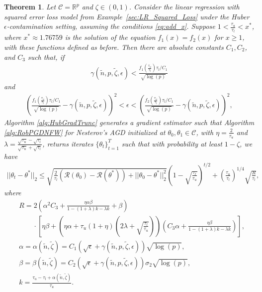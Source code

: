 \documentclass{article}
\newtheorem{theorem}{Theorem}
\begin{document}
\begin{theorem}
\label{theorem:Hu_eps_Nester}
Let $\mathcal{C} = \mathbb{R}^p$ and $\zeta \in (0, 1)$. Consider the linear regression with squared error loss model from Example~\ref{sec:LR_Squared_Loss} under the Huber $\epsilon$-contamination setting, assuming the conditions \eqref{eq:add_x}. Suppose $1 < \frac{\tau_u}{\tau_l} < x^*$, where $x^* \approx 1.76759$ is the solution of the equation $f_1(x) = f_2(x)$ for $x \geq 1$, with these functions defined as before. Then there are absolute constants $C_1, C_2$, and $C_3$ such that, if \begin{align*}
\gamma(\widetilde{n}, p, \widetilde{\zeta}, \epsilon) < \frac{f_1\left(\frac{\tau_u}{\tau_l}\right)\tau_l/C_1}{\sqrt{\log(p)}}
\end{align*}
and
\begin{align*}
\left(\frac{f_1\left(\frac{\tau_u}{\tau_l}\right)\tau_l/C_1}{\sqrt{\log(p)}} - \gamma(\widetilde{n}, p, \widetilde{\zeta}, \epsilon)\right)^2 < \epsilon < \left(\frac{f_2\left(\frac{\tau_u}{\tau_l}\right)\tau_l/C_1}{\sqrt{\log(p)}} - \gamma(\widetilde{n}, p, \widetilde{\zeta}, \epsilon)\right)^2,
\end{align*}  
Algorithm \ref{alg:HubGradTrunc} generates a gradient estimator such that Algorithm \ref{alg:RobPGDNFW} for Nesterov's AGD initialized at $\theta_0, \theta_1 \in \mathcal{C}$, with $\eta = \frac{2}{\tau_u}$ and $\lambda = \frac{\sqrt{\tau_u} - \sqrt{\tau_l}}{\sqrt{\tau_u} + \sqrt{\tau_l}}$, returns iterates $\{\theta_t\}_{t = 1}^T$ such that with probability at least $1 - \zeta$, we have
\begin{align}
\label{eq:glmreshubAGD}
||\theta_t - \theta^*||_2 \leq \sqrt{\frac{2}{\tau_l}\left(\mathcal{R}(\theta_0) - \mathcal{R}(\theta^*)\right) + ||\theta_0 - \theta^*||_2^2}\left(1 - \sqrt{\frac{\tau_l}{\tau_u}}\right)^{t/2} + \left(\frac{\tau_u}{\tau_l}\right)^{1/4}\sqrt{\frac{R}{\tau_l}},
\end{align}
where 
\begin{align*}
&R = 2\left(\alpha^2 C_3 + \frac{\eta\alpha\beta}{1 - (1 + \lambda)k - \lambda k} + \beta\right)\\
& \qquad \cdot \left[\eta\beta + \left(\eta\alpha + \tau_u(1 + \eta)\left(2\lambda + \sqrt{\frac{\tau_l}{\tau_u}}\right)\right)\left(C_3\alpha + \frac{\eta\beta}{1 - (1 + \lambda)k - \lambda k}\right)\right],\\
&\alpha = \alpha(\widetilde{n}, \widetilde{\zeta}) = C_1(\sqrt{\epsilon} + \gamma(\widetilde{n}, p, \widetilde{\zeta}, \epsilon))\sqrt{\log(p)},\\
&\beta = \beta(\widetilde{n}, \widetilde{\zeta}) = C_2(\sqrt{\epsilon} + \gamma(\widetilde{n}, p, \widetilde{\zeta}, \epsilon))\sigma_2\sqrt{\log(p)},\\
&k = \frac{\tau_u - \tau_l + \alpha(\widetilde{n}, \widetilde{\zeta})}{\tau_u}.
\end{align*}
\end{theorem}
\end{document}
